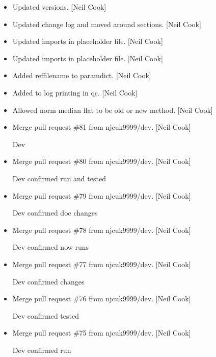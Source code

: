 \documentclass[a4paper,10pt,english]{report}
\begin{document}
\begin{itemize}
\item {} 
Updated versions. {[}Neil Cook{]}

\item {} 
Updated change log and moved around sections. {[}Neil Cook{]}

\item {} 
Updated imports in placeholder file. {[}Neil Cook{]}

\item {} 
Updated imports in placeholder file. {[}Neil Cook{]}

\item {} 
Added reffilename to paramdict. {[}Neil Cook{]}

\item {} 
Added to log printing in qc. {[}Neil Cook{]}

\item {} 
Allowed norm median flat to be old or new method. {[}Neil Cook{]}

\item {} 
Merge pull request \#81 from njcuk9999/dev. {[}Neil Cook{]}

Dev

\item {} 
Merge pull request \#80 from njcuk9999/dev. {[}Neil Cook{]}

Dev \sphinxhyphen{} confirmed run and tested

\item {} 
Merge pull request \#79 from njcuk9999/dev. {[}Neil Cook{]}

Dev \sphinxhyphen{} confirmed doc changes

\item {} 
Merge pull request \#78 from njcuk9999/dev. {[}Neil Cook{]}

Dev \sphinxhyphen{} confirmed \sphinxhyphen{}  now runs

\item {} 
Merge pull request \#77 from njcuk9999/dev. {[}Neil Cook{]}

Dev \sphinxhyphen{} confirmed changes

\item {} 
Merge pull request \#76 from njcuk9999/dev. {[}Neil Cook{]}

Dev \sphinxhyphen{} confirmed tested

\item {} 
Merge pull request \#75 from njcuk9999/dev. {[}Neil Cook{]}

Dev \sphinxhyphen{} confirmed run


\end{itemize}
\end{document}
